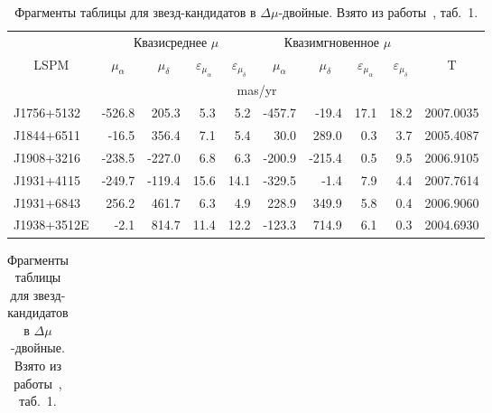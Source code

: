 \begin{table}[htbp]
\centering
\caption{Фрагменты таблицы для звезд-кандидатов в $\Delta\mu$-двойные.  Взято из работы~\cite{2015AstL...41..833K}, таб.~1.}
\label{tab:candidates}
\vspace{5mm}
\begin{tabularx}{\textwidth}{l|r|r|r|r|r|r|r|r|l} \hline
           & \multicolumn{4}{c|}{Квазисреднее $\mu$ } & \multicolumn{4}{c|}{Квазимгновенное $\mu$}& \\ \cline{2-9}
\multicolumn{1}{c|}{LSPM}&\multicolumn{1}{c|}{$\mu_\alpha$}&\multicolumn{1}{c|}{$\mu_\delta$}&\multicolumn{1}{c|}{$\varepsilon_{\mu_\alpha}$}&\multicolumn{1}{c|}{$\varepsilon_{\mu_\delta}$}&\multicolumn{1}{c|}{$\mu_\alpha$}&\multicolumn{1}{c|}{$\mu_\delta$}&\multicolumn{1}{c|}{$\varepsilon_{\mu_\alpha}$}&\multicolumn{1}{c|}{$\varepsilon_{\mu_\delta}$}&\multicolumn{1}{c}{T}\\ \cline{2-9}	   
	       &\multicolumn{8}{c|}{mas/yr}&\\ \hline  
J1756+5132 & -526.8&  205.3&  5.3&  5.2& -457.7&  -19.4& 17.1& 18.2& 2007.0035\\
J1844+6511 &  -16.5&  356.4&  7.1&  5.4&   30.0&  289.0&  0.3&  3.7& 2005.4087\\
J1908+3216 & -238.5& -227.0&  6.8&  6.3& -200.9& -215.4&  0.5&  9.5& 2006.9105\\
J1931+4115 & -249.7& -119.4& 15.6& 14.1& -329.5&   -1.4&  7.9&  4.4& 2007.7614\\
J1931+6843 &  256.2&  461.7&  6.3&  4.9&  228.9&  349.9&  5.8&  0.4& 2006.9060\\
J1938+3512E&   -2.1&  814.7& 11.4& 12.2& -123.3&  714.9&  6.1&  0.3& 2004.6930\\ \hline
\end{tabularx}
\begin{tabularx}{\textwidth}{l|r|c|r|r|r|r|r|r|l}


\end{tabularx}
\end{table}
